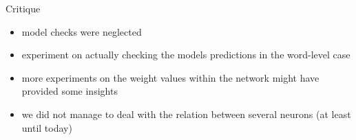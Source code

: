 \begin{frame}{Critique}
	\begin{itemize}
		\item model checks were neglected
		\item experiment on actually checking the models predictions in the word-level case
		\item more experiments on the weight values within the network might have provided some insights
		\item we did not manage to deal with the relation between several neurons (at least until today)
	\end{itemize}
\end{frame}